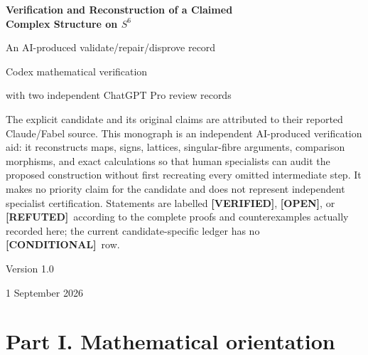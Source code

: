 \documentclass[11pt,letterpaper]{article}
\newcommand{\Status}[2]{\textcolor{#1}{\textbf{[#2]}}}
\newcommand{\Verified}{\Status{Verified}{VERIFIED}}
\newcommand{\Conditional}{\Status{Conditional}{CONDITIONAL}}
\newcommand{\Open}{\Status{Open}{OPEN}}
\newcommand{\Refuted}{\Status{Refuted}{REFUTED}}
\theoremstyle{definition}
\theoremstyle{remark}
\begin{document}
\hypersetup{pageanchor=false}
\begin{titlepage}
\centering
\vspace*{0.11\textheight}
{\LARGE\bfseries Verification and Reconstruction of a Claimed\\[4pt]
Complex Structure on $S^6$\par}
\vspace{1.1em}
{\Large An AI-produced validate/repair/disprove record\par}
\vspace{2.2em}
{\large Codex mathematical verification\par}
\vspace{0.35em}
{\normalsize with two independent ChatGPT Pro review records\par}
\vfill
\begin{minipage}{0.82\textwidth}
\small
The explicit candidate and its original claims are attributed to their
reported Claude/Fabel source.  This monograph is an independent
AI-produced verification aid: it reconstructs maps, signs, lattices,
singular-fibre arguments, comparison morphisms, and exact calculations so
that human specialists can audit the proposed construction without first
recreating every omitted intermediate step.  It makes no priority claim for
the candidate and does not represent independent specialist certification.
Statements are labelled \Verified, \Open, or \Refuted\ according to the
complete proofs and counterexamples actually recorded here; the current
candidate-specific ledger has no \Conditional\ row.
\end{minipage}
\vfill
{\large Version 1.0\par}
{\large 1 September 2026\par}
\end{titlepage}
\hypersetup{pageanchor=true}

\section*{Part I. Mathematical orientation}
\begingroup
\def\SIXOverviewEmbedded{1}

\endgroup

\clearpage
{}
\begingroup
\def\SIXWorkbenchEmbedded{1}

\endgroup
\end{document}
